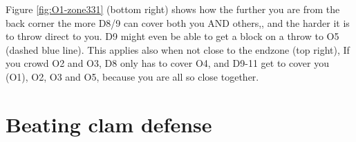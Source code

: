\documentclass{tufte-handout}
\begin{document}
Figure \ref{fig:O1-zone331} (bottom right) shows 
how the further 
you are from the back corner 
the more D8/9 
can cover both you
AND others,, 
and the harder 
it is to throw direct to you.
D9 might even be able to get a block
on a throw to O5
(dashed blue line). 
This applies also when 
not close to the endzone 
(top right),
If you crowd O2 and O3,
D8 only has to cover O4, 
and D9-11 get to cover 
you (O1),
O2, 
O3 and 
O5, 
because you are all 
so close together.

\section{Beating clam defense}\label{sec:zone}
\end{document}
